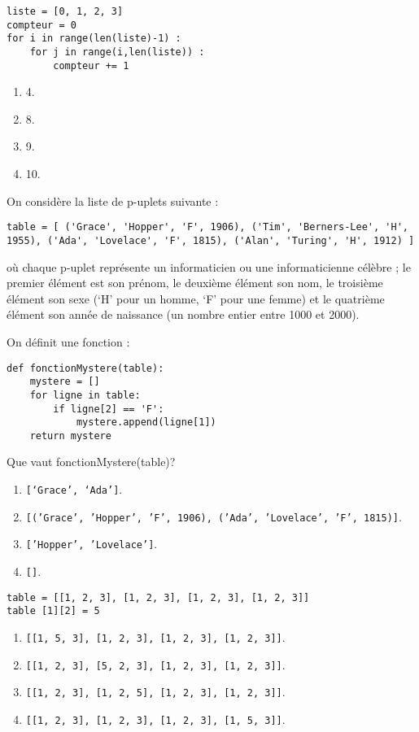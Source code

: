 \begin{lstlisting}
liste = [0, 1, 2, 3]
compteur = 0
for i in range(len(liste)-1) :
    for j in range(i,len(liste)) :
        compteur += 1
\end{lstlisting}
\begin{enumerate}
\item 4.
\item 8.
\item 9. %
\item 10.
\end{enumerate}

\question{}
On considère la liste de p-uplets suivante :
\begin{lstlisting}
table = [ ('Grace', 'Hopper', 'F', 1906), ('Tim', 'Berners-Lee', 'H', 1955), ('Ada', 'Lovelace', 'F', 1815), ('Alan', 'Turing', 'H', 1912) ]
\end{lstlisting}
où chaque p-uplet représente un informaticien ou une informaticienne célèbre ; le premier élément est son prénom, le deuxième élément son nom, le troisième élément son sexe (‘H’ pour un homme, ‘F’ pour une femme) et le quatrième élément son année de naissance (un nombre entier entre 1000 et 2000).

On définit une fonction :
\begin{lstlisting}
def fonctionMystere(table):
    mystere = []
    for ligne in table:
        if ligne[2] == 'F':
            mystere.append(ligne[1])
    return mystere
\end{lstlisting}
Que vaut fonctionMystere(table)?
\begin{enumerate}
\item \texttt{[‘Grace’, ‘Ada’]}.
\item \texttt{[('Grace', 'Hopper', 'F', 1906), ('Ada', 'Lovelace', 'F', 1815)]}.
\item \texttt{['Hopper', 'Lovelace']}. %
\item \texttt{[]}.
\end{enumerate}

\begin{lstlisting}
table = [[1, 2, 3], [1, 2, 3], [1, 2, 3], [1, 2, 3]]
table [1][2] = 5
\end{lstlisting}
\begin{enumerate}
\item \texttt{[[1, 5, 3], [1, 2, 3], [1, 2, 3], [1, 2, 3]]}.
\item \texttt{[[1, 2, 3], [5, 2, 3], [1, 2, 3], [1, 2, 3]]}.
\item \texttt{[[1, 2, 3], [1, 2, 5], [1, 2, 3], [1, 2, 3]]}. %
\item \texttt{[[1, 2, 3], [1, 2, 3], [1, 2, 3], [1, 5, 3]]}.
\end{enumerate}

